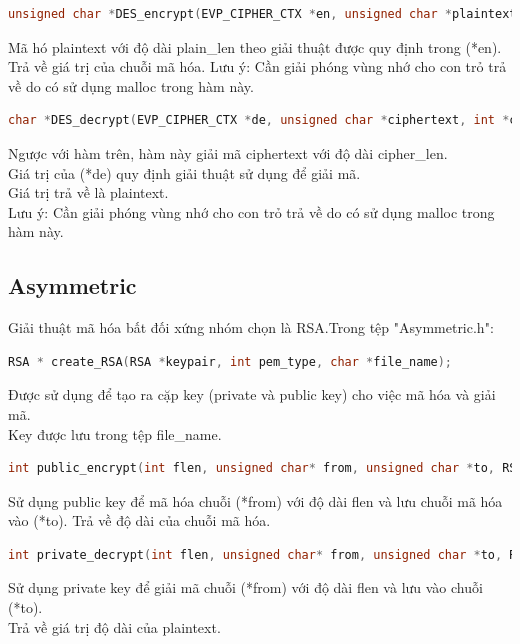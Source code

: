 \documentclass[a4paper]{article}
\begin{document}
	\begin{lstlisting}[language=C]
unsigned char *DES_encrypt(EVP_CIPHER_CTX *en, unsigned char *plaintext, int *plain_len);
	\end{lstlisting}
	Mã hó plaintext với độ dài plain\_len theo giải thuật được quy định trong (*en).
	Trả về giá trị của chuỗi mã hóa.
	Lưu ý: Cần giải phóng vùng nhớ cho con trỏ trả về do có sử dụng malloc trong hàm này.\\

	\begin{lstlisting}[language=C]
char *DES_decrypt(EVP_CIPHER_CTX *de, unsigned char *ciphertext, int *cipher_len);
	\end{lstlisting}
	Ngược với hàm trên, hàm này giải mã ciphertext với độ dài cipher\_len.\\
	Giá trị của (*de) quy định giải thuật sử dụng để giải mã.\\
	Giá trị trả về là plaintext.\\
	Lưu ý: Cần giải phóng vùng nhớ cho con trỏ trả về do có sử dụng malloc trong hàm này.\\
	\subsection{Asymmetric}
	Giải thuật mã hóa bất đối xứng nhóm chọn là RSA.Trong tệp "Asymmetric.h":\\
	\begin{lstlisting}[language=C]
RSA * create_RSA(RSA *keypair, int pem_type, char *file_name);
	\end{lstlisting}
	Được sử dụng để tạo ra cặp key (private và public key) cho việc mã hóa và giải mã.\\
	Key được lưu trong tệp file\_name.\\

	\begin{lstlisting}[language=C]
int public_encrypt(int flen, unsigned char* from, unsigned char *to, RSA* key, int padding);
	\end{lstlisting}
	Sử dụng public key để mã hóa chuỗi (*from) với độ dài flen và lưu chuỗi mã hóa vào (*to).
	Trả về độ dài của chuỗi mã hóa.\\

	\begin{lstlisting}[language=C]
int private_decrypt(int flen, unsigned char* from, unsigned char *to, RSA* key, int padding);
	\end{lstlisting}
	Sử dụng private key để giải mã chuỗi (*from) với độ dài flen và lưu vào chuỗi (*to).\\
	Trả về giá trị độ dài của plaintext.
\end{document}
